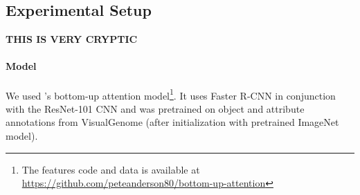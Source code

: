 

\subsection{Experimental Setup}
\textbf{THIS IS VERY CRYPTIC}
\paragraph{Model}
We used \citeauthor{anderson2018updown}'s \citeyear{anderson2018updown} bottom-up attention model\footnote{The features code and data is available at \url{https://github.com/peteanderson80/bottom-up-attention}}. 
It uses Faster R-CNN in conjunction with the ResNet-101 CNN and was pretrained on object and attribute annotations from VisualGenome (after initialization with pretrained ImageNet model).
\iffalse
"To pretrain the bottom-up attention model, we first initialize Faster R-CNN with ResNet-101 pretrained for classification on ImageNet [35]. We then train on Visual
Genome [21] data. To aid the learning of good feature
representations, we add an additional training output for
predicting attribute classes (in addition to object classes).
To predict attributes for region i, we concatenate the mean
pooled convolutional feature vi with a learned embedding
of the ground-truth object class, and feed this into an additional output layer defining a softmax distribution over each
attribute class plus a ‘no attributes’ class.
The original Faster R-CNN multi-task loss function contains four components, defined over the classification and
bounding box regression outputs for both the RPN and the
final object class proposals respectively. We retain these
components and add an additional multi-class loss component to train the attribute predictor"
\fi

